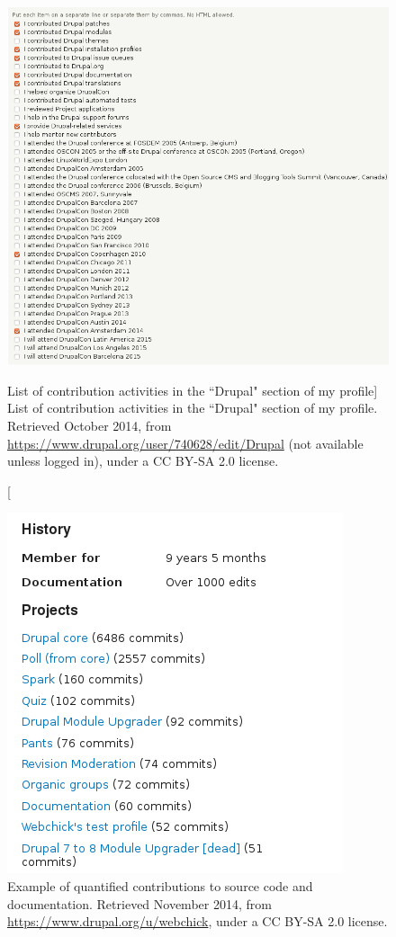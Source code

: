
    \begin{figure}[H]
        \centering
\includegraphics[scale=0.45]{img/profiles/list_contributions.png}
        \caption[List of contribution activities in the ``Drupal" section of my profile]%
        {List of contribution activities in the ``Drupal" section of my profile. Retrieved  October 2014, from \url{https://www.drupal.org/user/740628/edit/Drupal} (not available unless logged in), under a CC BY-SA 2.0 license.}
        \label{profiles_list_contributions}
    \end{figure}

    \begin{figure}[H]
        \centering
\includegraphics[scale=0.45]{img/profiles/code_documentation.png}
        \caption[Example of quantified contributions related to source code and documentation]%
        {Example of quantified contributions to source code and documentation. Retrieved  November 2014, from \url{https://www.drupal.org/u/webchick}, under a CC BY-SA 2.0 license.}
        \label{profiles_code_documentation}
    \end{figure}

